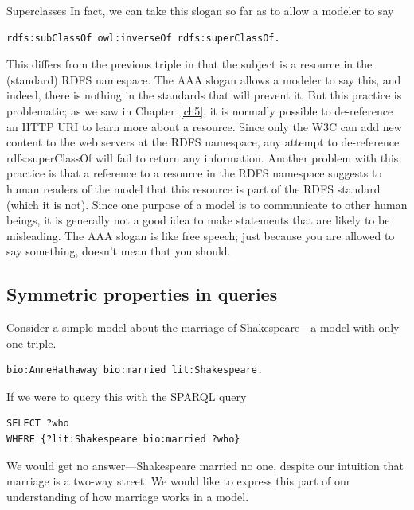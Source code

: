 \begin{challenge}{Superclasses}
In fact, we can take this slogan so far as to allow a modeler to say

\begin{lstlisting}
rdfs:subClassOf owl:inverseOf rdfs:superClassOf.
\end{lstlisting}

This differs from the previous triple in that the subject is a resource
in the (standard) RDFS namespace. The AAA slogan allows a modeler to say
this,  and indeed, there is nothing in the standards that will prevent
it. But this practice is problematic; as we saw in Chapter~\ref{ch5}, it is normally possible to de-reference 
an HTTP URI to learn more about a resource.  Since only the W3C can add new content to the 
web servers at the RDFS namespace, any attempt to de-reference rdfs:superClassOf will fail to return any information. 
Another problem with this practice is that  a reference to a resource in the RDFS namespace 
suggests to human readers of the model that this resource is part of
the RDFS standard (which it is not). Since one purpose of a model is to communicate to
other human beings, it is generally not a good idea to make statements
that are likely to be misleading.   The AAA slogan is like free speech; just because you are 
allowed to say something, doesn't mean that you should. 
\end{challenge}

\subsection{Symmetric  properties in queries}

Consider a simple model about the marriage of Shakespeare---a model with
only one triple.

\begin{lstlisting}
bio:AnneHathaway bio:married lit:Shakespeare.
\end{lstlisting}

If we were to query this with the SPARQL query

\begin{lstlisting}
SELECT ?who
WHERE {?lit:Shakespeare bio:married ?who}
\end{lstlisting}

We would get no answer---Shakespeare married no one, despite our
intuition that marriage is a two-way street. We would like to express
this part of our understanding of how marriage works in a model.

